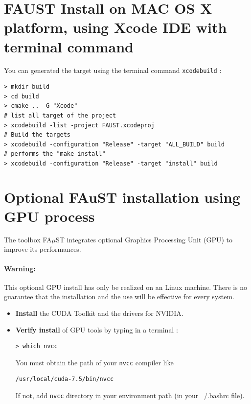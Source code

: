 \section{FAUST Install on MAC OS X platform, using Xcode IDE with terminal command}\label{sec:ANNEXEInstallMACXcodeTerminal}
You can generated the target using the terminal command \texttt{xcodebuild} :
\lstset{style=customBash}
\begin{lstlisting}
> mkdir build
> cd build
> cmake .. -G "Xcode"	
# list all target of the project
> xcodebuild -list -project FAUST.xcodeproj 	
# Build the targets
> xcodebuild -configuration "Release" -target "ALL_BUILD" build 	
# performs the "make install"
> xcodebuild -configuration "Release" -target "install" build 
\end{lstlisting}


\section{Optional FAuST installation using GPU process}\label{sec:OptionalGPU}

The toolbox FA$\mu$ST integrates optional Graphics Processing Unit (GPU) to improve its performances.
\paragraph{Warning:} This optional GPU install has only be realized on an Linux machine. There is no guarantee that the installation and the use will be effective for every system.

\begin{itemize}
\item \textbf{Install} the CUDA Toolkit and the drivers for NVIDIA.
\item \textbf{Verify install} of GPU tools by typing in a terminal :
\lstset{style=customBash} 
\begin{lstlisting}
> which nvcc
\end{lstlisting}
You must obtain the path of your \texttt{nvcc} compiler like 
\begin{lstlisting}
/usr/local/cuda-7.5/bin/nvcc
\end{lstlisting}
If not, add \texttt{nvcc} directory in your environment path (in your ~/.bashrc file). 
\end{itemize}



